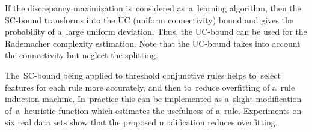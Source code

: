 \documentclass{article}
\begin{document}
If the discrepancy maximization is~considered as~a~learning algorithm,
then the SC-bound transforms into the UC (uniform connectivity) bound
and gives the probability of a~large uniform deviation.
Thus, the UC-bound can be used for the Rademacher complexity estimation.
Note that the UC-bound takes into account the connectivity but neglect the splitting.

The~SC-bound being applied to threshold conjunctive rules
helps to~select features for each rule more accurately,
and then to~reduce overfitting of a~rule induction machine.
In~practice this can be implemented as a~slight modification
of~a~heuristic function which estimates the usefulness of a~rule.
Experiments on six real data sets show that
the proposed modification reduces overfitting.

%
\end{document}
